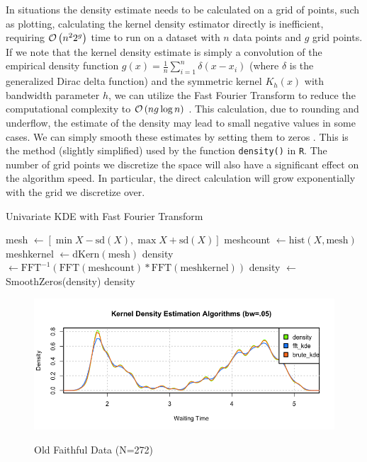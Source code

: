 \documentclass[12pt]{article}
\begin{document}
In situations the density estimate needs to be calculated on a grid of
points, such as plotting, calculating the kernel density estimator
directly is inefficient, requiring \(\mathcal{O}\left( n^22^g \right)\) time to run on a
dataset with \(n\) data points and \(g\) grid points. If we note that
the kernel density estimate is simply a convolution of the empirical
density function \(g(x) = \frac{1}{n} \sum_{i=1}^{n}\delta(x-x_i)\)
(where \(\delta\) is the generalized Dirac delta function) and the
symmetric kernel \(K_h(x)\) with bandwidth parameter \(h\), we can
utilize the Fast Fourier Transform to reduce the computational
complexity to \(\mathcal{O}\left( ng\log n \right)\)
\citep{wand1994fast, lohne2017computational}. This calculation, due to
rounding and underflow, the estimate of the density may lead to small
negative values in some cases. We can simply smooth these estimates by
setting them to zeros \citep{silverman1982algorithm}. This is the method
(slightly simplified) used by the function \texttt{density()} in
\texttt{R}. The number of grid points we discretize the space will also
have a significant effect on the algorithm speed. In particular, the
direct calculation will grow exponentially with the grid we discretize
over.

\begin{algorithm}[H]
\caption{Univariate KDE with Fast Fourier Transform}
\begin{algorithmic}
  \State mesh $\gets [\min X - \mathrm{sd}(X), \max X + \mathrm{sd}(X)]$
  \State meshcount $\gets \mathrm{hist}(X, \mathrm{mesh})$
  \State meshkernel $\gets \mathrm{dKern}(\mathrm{mesh})$ 
  \State density $\gets \mathrm{FFT}^{-1}(\mathrm{FFT}(\mathrm{meshcount}) * \mathrm{FFT}(\mathrm{meshkernel}))$
  \State density $\gets$ SmoothZeros(density)
  \State \Return density
\EndFunction
\end{algorithmic}
\end{algorithm}

\begin{figure}[h]
\caption{Old Faithful Data (N=272)}
\includegraphics[scale=.5]{density_comparison}
\centering
\label{fig:plot1}
\end{figure}
\end{document}
